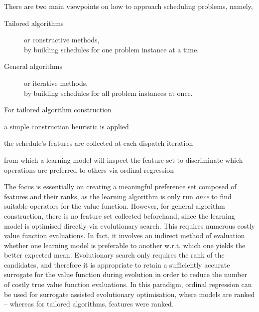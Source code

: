 There are two main viewpoints on how to approach scheduling problems, namely,
\begin{description}
  \item[Tailored algorithms] or constructive methods, \\
  by building schedules for one problem instance at a time.
  \item[General algorithms] or iterative methods, \\ 
  by building schedules for all problem instances at once.
\end{description}
For tailored algorithm construction
\begin{enumerate*} %
  \item a simple construction heuristic is applied 
  \item the schedule's features are collected at each dispatch iteration
  \item from which a learning model will inspect the feature set to 
  discriminate which operations are preferred to others via ordinal regression 
\end{enumerate*}
The focus is essentially on creating a meaningful preference set composed of 
features and their ranks, as the learning algorithm is only run \emph{once} to 
find suitable operators for the value function. 
However, for general algorithm construction, there is no feature set collected 
beforehand, since the learning model is optimised directly via evolutionary 
search. This requires numerous costly value function evaluations. 
In fact, it involves an indirect method of evaluation whether one learning 
model is preferable to another w.r.t. which one yields the better expected 
mean. 
Evolutionary search only requires the rank of the candidates, and therefore it 
is appropriate to retain a sufficiently accurate surrogate for the value 
function during evolution in order to reduce the number of costly true value 
function evaluations. 
In this paradigm, ordinal regression can be used for surrogate assisted 
evolutionary optimisation, where models are ranked -- whereas for tailored 
algorithms, features were ranked. 

